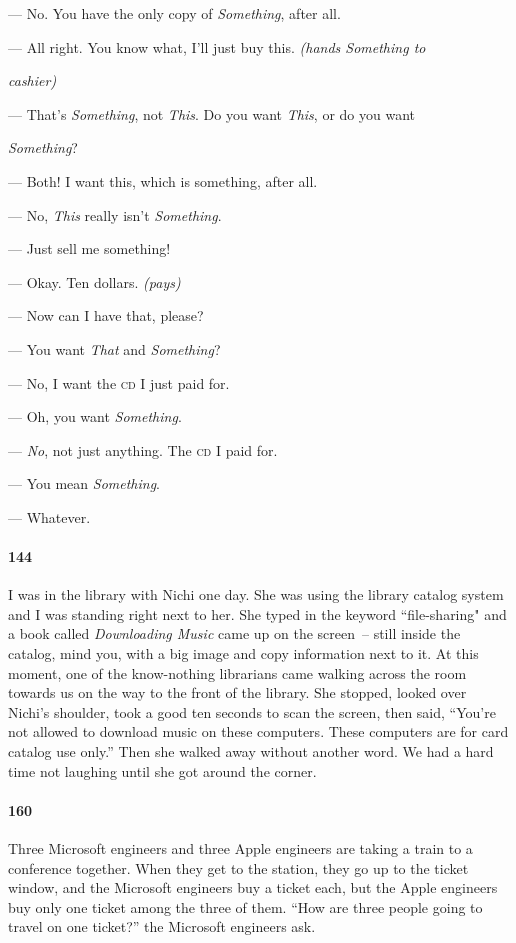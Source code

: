\documentclass[10pt]{memoir}
\begin{document}
--- No. You have the only copy of \emph{Something}, after all.

--- All right. You know what, I'll just buy this. \emph{(hands \emph{Something} to}

\noindent \hspace{\parindent}\hspace{1em} \emph{cashier)}

--- That's \emph{Something}, not \emph{This}. Do you want \emph{This}, or do you want

\noindent \hspace{\parindent}\hspace{1em} \emph{Something}?

--- Both! I want this, which is something, after all.

--- No, \emph{This} really isn't \emph{Something}.

--- Just sell me something!

--- Okay. Ten dollars. \emph{(pays)}

--- Now can I have that, please?

--- You want \emph{That} and \emph{Something}?

--- No, I want the \textsc{cd} I just paid for.

--- Oh, you want \emph{Something}.

--- \emph{No}, not just anything. The \textsc{cd} I paid for.

--- You mean \emph{Something}.

--- Whatever.

\paragraph{144} I was in the library with Nichi one day. She was using the library catalog system and I was standing right next to her. She typed in the keyword ``file-sharing" and a book called \emph{Downloading Music} came up on the screen~-- still inside the catalog, mind you, with a big image and copy information next to it. At this moment, one of the know-nothing librarians came walking across the room towards us on the way to the front of the library. She stopped, looked over Nichi's shoulder, took a good ten seconds to scan the screen, then said, “You're not allowed to download music on these computers. These computers are for card catalog use only.” Then she walked away without another word. We had a hard time not laughing until she got around the corner.

\paragraph{160} Three Microsoft engineers and three Apple engineers are taking a train to a conference together. When they get to the station, they go up to the ticket window, and the Microsoft engineers buy a ticket each, but the Apple engineers buy only one ticket among the three of them. ``How are three people going to travel on one ticket?'' the Microsoft engineers ask.
\end{document}
